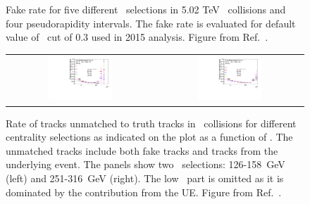 \begin{figure}
\begin{tabular}{cc}
\end{tabular}
\caption{Fake rate for five different \ptjet\ selections in 5.02 TeV \pp\ collisions and four pseudorapidity intervals.
The fake rate is evaluated for default value of \mcprob\ cut of 0.3 used in 2015 analysis.
Figure from Ref.~\cite{Sickles:2235420}.}
\label{fig:fakeratepp}
\end{figure}  

\begin{figure}
\centering
\begin{tabular}{cc}
\includegraphics[width=0.45\textwidth]{figures/main/corrections/fake_rate_pt_125GeV.pdf} &
\includegraphics[width=0.45\textwidth]{figures/main/corrections/fake_rate_pt_251GeV.pdf} \\
\end{tabular}
\caption{ Rate of tracks unmatched to truth tracks
in \pbpb\ collisions for different centrality selections as indicated on the plot as a function of \pttrk.
The unmatched tracks include both fake tracks and tracks from the underlying event.
The panels show two \ptjet\ selections: 126-158~GeV (left) and 251-316~GeV (right).
The low \pT\ part is omitted as it is dominated by the contribution from the UE.
Figure from Ref.~\cite{Sickles:2235420}.}
\label{fig:fakeratepbpb}
\end{figure}
